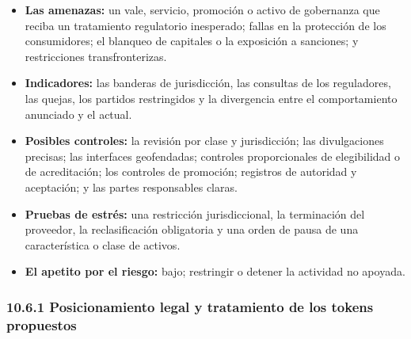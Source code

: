 \documentclass[11pt]{article}
\begin{document}
\begin{itemize}[leftmargin=*]
\item \textbf{Las amenazas:} un vale, servicio, promoción o activo de gobernanza que reciba un tratamiento regulatorio inesperado; fallas en la protección de los consumidores; el blanqueo de capitales o la exposición a sanciones; y restricciones transfronterizas.
\item \textbf{Indicadores:} las banderas de jurisdicción, las consultas de los reguladores, las quejas, los partidos restringidos y la divergencia entre el comportamiento anunciado y el actual.
\item \textbf{Posibles controles:} la revisión por clase y jurisdicción; las divulgaciones precisas; las interfaces geofendadas; controles proporcionales de elegibilidad o de acreditación; los controles de promoción; registros de autoridad y aceptación; y las partes responsables claras.
\item \textbf{Pruebas de estrés:} una restricción jurisdiccional, la terminación del proveedor, la reclasificación obligatoria y una orden de pausa de una característica o clase de activos.
\item \textbf{El apetito por el riesgo:} bajo; restringir o detener la actividad no apoyada.
\end{itemize}
\subsubsection*{10.6.1 Posicionamiento legal y tratamiento de los tokens propuestos}
\end{document}
